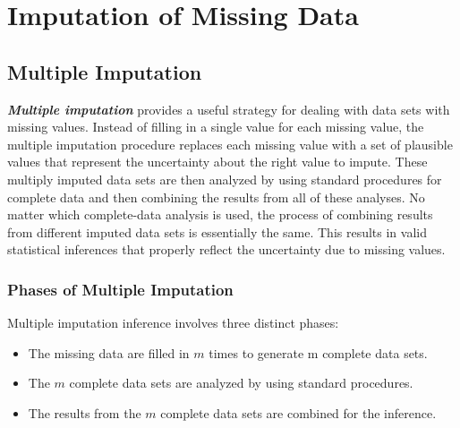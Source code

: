 \documentclass[a4paper,12pt]{article}
\begin{document}
	
\section{Imputation of Missing Data}	

\subsection{Multiple Imputation}
\textbf{\textit{Multiple imputation}} provides a useful strategy for dealing
with data sets with missing values. Instead of filling in a
single value for each missing value, the multiple
imputation procedure replaces each missing value with a
set of plausible values that represent the uncertainty about
the right value to impute. These multiply imputed data sets
are then analyzed by using standard procedures for complete
data and then combining the results from all of these analyses.
No matter which complete-data analysis is used, the process
of combining results from different imputed data sets
is essentially the same. This results in valid statistical inferences
that properly reflect the uncertainty due to missing
values.

\subsubsection{Phases of Multiple Imputation}
Multiple imputation inference involves three distinct phases:
\begin{itemize}
	\item The missing data are filled in $m$ times to generate m
	complete data sets.
	\item The $m$ complete data sets are analyzed by using
	standard procedures.
	\item The results from the $m$ complete data sets are combined
	for the inference.
\end{itemize}
\end{document}
